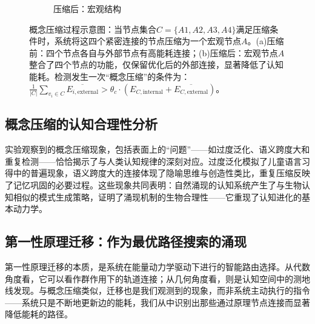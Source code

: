 \documentclass[12pt,a4paper]{article}
\begin{document}
\begin{figure}[H]
\begin{subfigure}[b]{0.45\textwidth}
\caption{压缩后：宏观结构}
\end{subfigure}
\vspace{0.5cm}

\caption{概念压缩过程示意图：当节点集合$C=\{A1,A2,A3,A4\}$满足压缩条件时，系统将这四个紧密连接的节点压缩为一个宏观节点$A$。(a)压缩前：四个节点各自与外部节点有高能耗连接；(b)压缩后：宏观节点$A$整合了四个节点的功能，仅保留优化后的外部连接，显著降低了认知能耗。检测发生一次“概念压缩”的条件为：$\frac{1}{|C|}\sum_{v_i\in C}\overline{E_{i,\text{external}}} > \theta_c\cdot(E_{C,\text{internal}}+\overline{E_{C,\text{external}}})$。}
\label{fig:compression_process}
\end{figure}

\subsection{概念压缩的认知合理性分析}

实验观察到的概念压缩现象，包括表面上的“问题”——如过度泛化、语义跨度大和重复检测——恰恰揭示了与人类认知规律的深刻对应。过度泛化模拟了儿童语言习得中的普遍现象，语义跨度大的连接体现了隐喻思维与创造性类比，重复压缩反映了记忆巩固的必要过程。这些现象共同表明：自然涌现的认知系统产生了与生物认知相似的模式生成策略，证明了涌现机制的生物合理性——它重现了认知进化的基本动力学。

\subsection{第一性原理迁移：作为最优路径搜索的涌现}

第一性原理迁移的本质，是系统在能量动力学驱动下进行的智能路由选择。从代数角度看，它可以看作群作用下的轨道连接；从几何角度看，则是认知空间中的测地线发现。与概念压缩类似，迁移也是我们观测到的现象，而非系统主动执行的指令——系统只是不断地更新边的能耗，我们从中识别出那些通过原理节点连接而显著降低能耗的路径。
\end{document}
